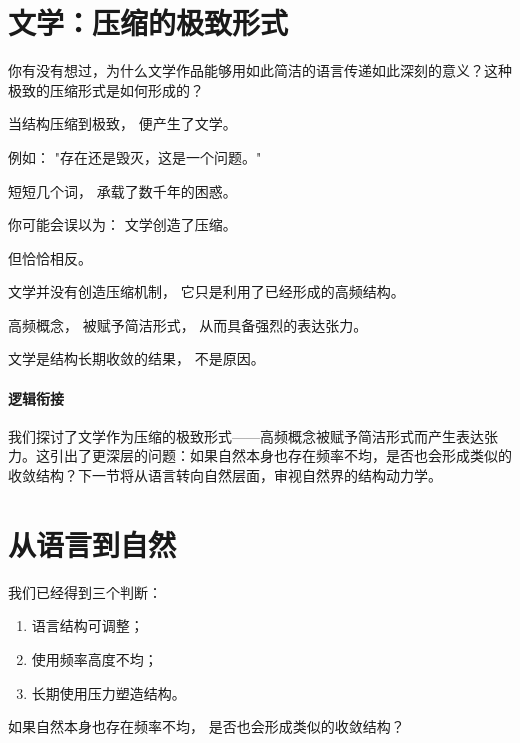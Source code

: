 \documentclass[../main.tex]{subfiles}
\begin{document}
\section{文学：压缩的极致形式}

\begin{questionbox}
	你有没有想过，为什么文学作品能够用如此简洁的语言传递如此深刻的意义？这种极致的压缩形式是如何形成的？
\end{questionbox}

当结构压缩到极致，
便产生了文学。

例如：
"存在还是毁灭，这是一个问题。"

短短几个词，
承载了数千年的困惑。

\begin{tcolorbox}[colback=yellow!5,title=\textit{读者行为预测}]
	你可能会误以为：
	文学创造了压缩。

	但恰恰相反。
\end{tcolorbox}

文学并没有创造压缩机制，
它只是利用了已经形成的高频结构。

高频概念，
被赋予简洁形式，
从而具备强烈的表达张力。

文学是结构长期收敛的结果，
不是原因。

\paragraph*{逻辑衔接}
我们探讨了文学作为压缩的极致形式——高频概念被赋予简洁形式而产生表达张力。这引出了更深层的问题：如果自然本身也存在频率不均，是否也会形成类似的收敛结构？下一节将从语言转向自然层面，审视自然界的结构动力学。


\section{从语言到自然}

我们已经得到三个判断：

\begin{enumerate}
	\item 语言结构可调整；
	\item 使用频率高度不均；
	\item 长期使用压力塑造结构。
\end{enumerate}

\begin{questionbox}
	如果自然本身也存在频率不均，
	是否也会形成类似的收敛结构？
\end{questionbox}
\end{document}
